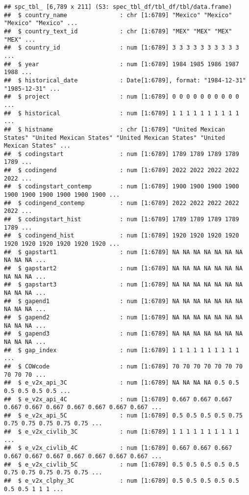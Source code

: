 \documentclass[
]{article}
\begin{document}
\begin{verbatim}
## spc_tbl_ [6,789 x 211] (S3: spec_tbl_df/tbl_df/tbl/data.frame)
##  $ country_name               : chr [1:6789] "Mexico" "Mexico" "Mexico" "Mexico" ...
##  $ country_text_id            : chr [1:6789] "MEX" "MEX" "MEX" "MEX" ...
##  $ country_id                 : num [1:6789] 3 3 3 3 3 3 3 3 3 3 ...
##  $ year                       : num [1:6789] 1984 1985 1986 1987 1988 ...
##  $ historical_date            : Date[1:6789], format: "1984-12-31" "1985-12-31" ...
##  $ project                    : num [1:6789] 0 0 0 0 0 0 0 0 0 0 ...
##  $ historical                 : num [1:6789] 1 1 1 1 1 1 1 1 1 1 ...
##  $ histname                   : chr [1:6789] "United Mexican States" "United Mexican States" "United Mexican States" "United Mexican States" ...
##  $ codingstart                : num [1:6789] 1789 1789 1789 1789 1789 ...
##  $ codingend                  : num [1:6789] 2022 2022 2022 2022 2022 ...
##  $ codingstart_contemp        : num [1:6789] 1900 1900 1900 1900 1900 1900 1900 1900 1900 1900 ...
##  $ codingend_contemp          : num [1:6789] 2022 2022 2022 2022 2022 ...
##  $ codingstart_hist           : num [1:6789] 1789 1789 1789 1789 1789 ...
##  $ codingend_hist             : num [1:6789] 1920 1920 1920 1920 1920 1920 1920 1920 1920 1920 ...
##  $ gapstart1                  : num [1:6789] NA NA NA NA NA NA NA NA NA NA ...
##  $ gapstart2                  : num [1:6789] NA NA NA NA NA NA NA NA NA NA ...
##  $ gapstart3                  : num [1:6789] NA NA NA NA NA NA NA NA NA NA ...
##  $ gapend1                    : num [1:6789] NA NA NA NA NA NA NA NA NA NA ...
##  $ gapend2                    : num [1:6789] NA NA NA NA NA NA NA NA NA NA ...
##  $ gapend3                    : num [1:6789] NA NA NA NA NA NA NA NA NA NA ...
##  $ gap_index                  : num [1:6789] 1 1 1 1 1 1 1 1 1 1 ...
##  $ COWcode                    : num [1:6789] 70 70 70 70 70 70 70 70 70 70 ...
##  $ e_v2x_api_3C               : num [1:6789] NA NA NA NA 0.5 0.5 0.5 0.5 0.5 0.5 ...
##  $ e_v2x_api_4C               : num [1:6789] 0.667 0.667 0.667 0.667 0.667 0.667 0.667 0.667 0.667 0.667 ...
##  $ e_v2x_api_5C               : num [1:6789] 0.5 0.5 0.5 0.5 0.75 0.75 0.75 0.75 0.75 0.75 ...
##  $ e_v2x_civlib_3C            : num [1:6789] 1 1 1 1 1 1 1 1 1 1 ...
##  $ e_v2x_civlib_4C            : num [1:6789] 0.667 0.667 0.667 0.667 0.667 0.667 0.667 0.667 0.667 0.667 ...
##  $ e_v2x_civlib_5C            : num [1:6789] 0.5 0.5 0.5 0.5 0.5 0.75 0.75 0.75 0.75 0.75 ...
##  $ e_v2x_clphy_3C             : num [1:6789] 0.5 0.5 0.5 0.5 0.5 0.5 0.5 1 1 1 ...

\end{verbatim}
\end{document}
